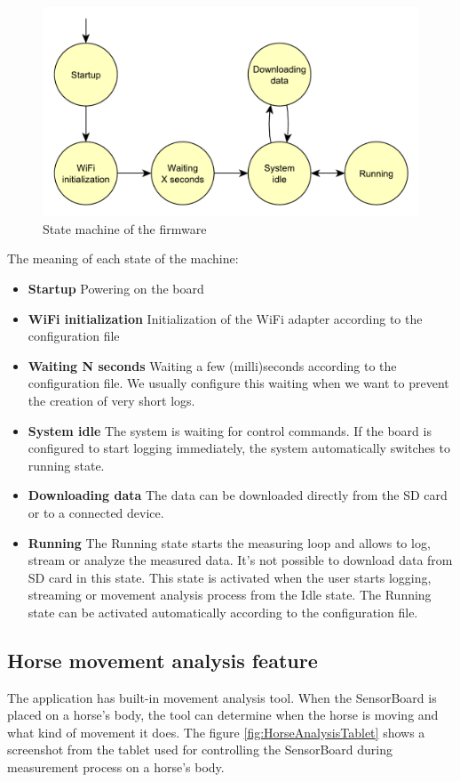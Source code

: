 \begin{figure}
	\centering
	\label{firmwareStateMachine}
	\caption{State machine of the firmware}
	\includegraphics[width=\linewidth]{img/firmwareStateMachine.pdf}
\end{figure}

The meaning of each state of the machine:
\begin{itemize}
	\item \textbf{Startup} Powering on the board
	\item \textbf{WiFi initialization} Initialization of the WiFi adapter according to the configuration file
	\item \textbf{Waiting N seconds} Waiting a few (milli)seconds according to the configuration file. We usually configure this waiting when we want to prevent the creation of very short logs.
	\item \textbf{System idle} The system is waiting for control commands. If the board is configured to start logging immediately, the system automatically switches to running state.
	\item \textbf{Downloading data} The data can be downloaded directly from the SD card or to a connected device.
	\item \textbf{Running} The Running state starts the measuring loop and allows to log, stream or analyze the measured data. It's not possible to download data from SD card in this state. This state is activated when the user starts logging, streaming or movement analysis process from the Idle state. The Running state can be activated automatically according to the configuration file.
\end{itemize}

\subsection{Horse movement analysis feature}
The application has built-in movement analysis tool. When the SensorBoard is placed on a horse's body, the tool can determine when the horse is moving and what kind of movement it does. The figure \ref{fig:HorseAnalysisTablet} shows a screenshot from the tablet used for controlling the SensorBoard during measurement process on a horse's body.

